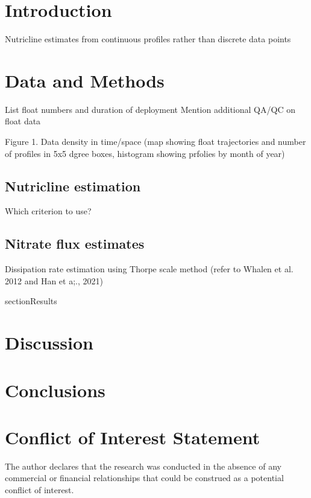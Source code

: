 \documentclass[utf8]{frontiersSCNS} %
\begin{document}
\section{Introduction}

Nutricline estimates from continuous profiles rather than discrete data points

\section{Data and Methods}
List float numbers and duration of deployment
Mention additional QA/QC on float data

Figure 1. Data density in time/space (map showing float trajectories and number of profiles in 5x5 dgree boxes, histogram showing prfolies by month of year)

\subsection{Nutricline estimation}
Which criterion to use? 

\subsection{Nitrate flux estimates}
Dissipation rate estimation using Thorpe scale method (refer to Whalen et al. 2012 and Han et a;., 2021)


section{Results}



\section{Discussion}


\section{Conclusions}


\section*{Conflict of Interest Statement}

The author declares that the research was conducted in the absence of any commercial or financial relationships that could be construed as a potential conflict of interest.
\end{document}
